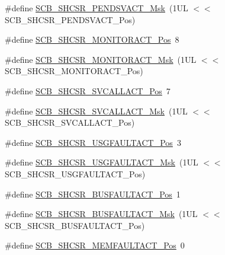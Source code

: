 \begin{DoxyCompactItemize}
\item 
\#define \mbox{\hyperlink{group___c_m_s_i_s___s_c_b_gae0e837241a515d4cbadaaae1faa8e039}{S\+C\+B\+\_\+\+S\+H\+C\+S\+R\+\_\+\+P\+E\+N\+D\+S\+V\+A\+C\+T\+\_\+\+Msk}}~(1\+U\+L $<$$<$ S\+C\+B\+\_\+\+S\+H\+C\+S\+R\+\_\+\+P\+E\+N\+D\+S\+V\+A\+C\+T\+\_\+\+Pos)
\item 
\#define \mbox{\hyperlink{group___c_m_s_i_s___s_c_b_ga8b71cf4c61803752a41c96deb00d26af}{S\+C\+B\+\_\+\+S\+H\+C\+S\+R\+\_\+\+M\+O\+N\+I\+T\+O\+R\+A\+C\+T\+\_\+\+Pos}}~8
\item 
\#define \mbox{\hyperlink{group___c_m_s_i_s___s_c_b_gaad09b4bc36e9bccccc2e110d20b16e1a}{S\+C\+B\+\_\+\+S\+H\+C\+S\+R\+\_\+\+M\+O\+N\+I\+T\+O\+R\+A\+C\+T\+\_\+\+Msk}}~(1\+U\+L $<$$<$ S\+C\+B\+\_\+\+S\+H\+C\+S\+R\+\_\+\+M\+O\+N\+I\+T\+O\+R\+A\+C\+T\+\_\+\+Pos)
\item 
\#define \mbox{\hyperlink{group___c_m_s_i_s___s_c_b_ga977f5176be2bc8b123873861b38bc02f}{S\+C\+B\+\_\+\+S\+H\+C\+S\+R\+\_\+\+S\+V\+C\+A\+L\+L\+A\+C\+T\+\_\+\+Pos}}~7
\item 
\#define \mbox{\hyperlink{group___c_m_s_i_s___s_c_b_ga634c0f69a233475289023ae5cb158fdf}{S\+C\+B\+\_\+\+S\+H\+C\+S\+R\+\_\+\+S\+V\+C\+A\+L\+L\+A\+C\+T\+\_\+\+Msk}}~(1\+U\+L $<$$<$ S\+C\+B\+\_\+\+S\+H\+C\+S\+R\+\_\+\+S\+V\+C\+A\+L\+L\+A\+C\+T\+\_\+\+Pos)
\item 
\#define \mbox{\hyperlink{group___c_m_s_i_s___s_c_b_gae06f54f5081f01ed3f6824e451ad3656}{S\+C\+B\+\_\+\+S\+H\+C\+S\+R\+\_\+\+U\+S\+G\+F\+A\+U\+L\+T\+A\+C\+T\+\_\+\+Pos}}~3
\item 
\#define \mbox{\hyperlink{group___c_m_s_i_s___s_c_b_gab3166103b5a5f7931d0df90949c47dfe}{S\+C\+B\+\_\+\+S\+H\+C\+S\+R\+\_\+\+U\+S\+G\+F\+A\+U\+L\+T\+A\+C\+T\+\_\+\+Msk}}~(1\+U\+L $<$$<$ S\+C\+B\+\_\+\+S\+H\+C\+S\+R\+\_\+\+U\+S\+G\+F\+A\+U\+L\+T\+A\+C\+T\+\_\+\+Pos)
\item 
\#define \mbox{\hyperlink{group___c_m_s_i_s___s_c_b_gaf272760f2df9ecdd8a5fbbd65c0b767a}{S\+C\+B\+\_\+\+S\+H\+C\+S\+R\+\_\+\+B\+U\+S\+F\+A\+U\+L\+T\+A\+C\+T\+\_\+\+Pos}}~1
\item 
\#define \mbox{\hyperlink{group___c_m_s_i_s___s_c_b_ga9d7a8b1054b655ad08d85c3c535d4f73}{S\+C\+B\+\_\+\+S\+H\+C\+S\+R\+\_\+\+B\+U\+S\+F\+A\+U\+L\+T\+A\+C\+T\+\_\+\+Msk}}~(1\+U\+L $<$$<$ S\+C\+B\+\_\+\+S\+H\+C\+S\+R\+\_\+\+B\+U\+S\+F\+A\+U\+L\+T\+A\+C\+T\+\_\+\+Pos)
\item 
\#define \mbox{\hyperlink{group___c_m_s_i_s___s_c_b_ga7c856f79a75dcc1d1517b19a67691803}{S\+C\+B\+\_\+\+S\+H\+C\+S\+R\+\_\+\+M\+E\+M\+F\+A\+U\+L\+T\+A\+C\+T\+\_\+\+Pos}}~0
$$
\end{DoxyCompactItemize}
